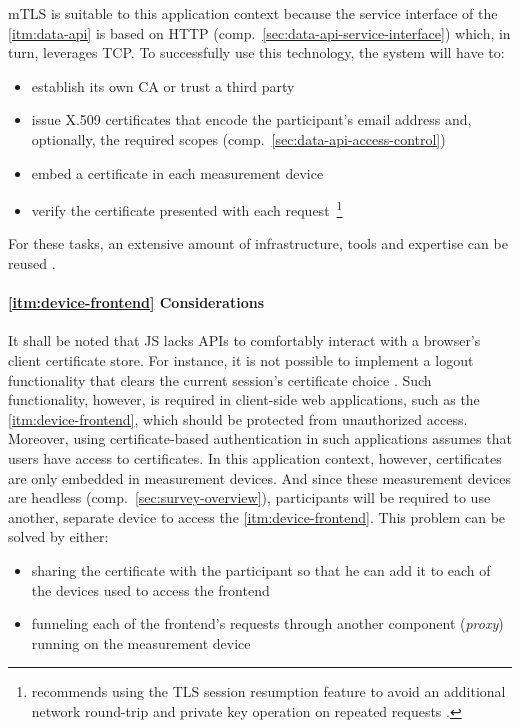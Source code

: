 \acs{mTLS} is suitable to this application context because the service interface of the \ref{itm:data-api} is based on \acs{HTTP} (comp.~\autoref{sec:data-api-service-interface}) which, in turn, leverages \acs{TCP}. To successfully use this technology, the system will have to:

\begin{itemize}
  \item establish its own \acs{CA} or trust a third party
  \item issue X.509 certificates that encode the participant's email address and, optionally, the required scopes (comp.~\autoref{sec:data-api-access-control})
  \item embed a certificate in each measurement device
  \item verify the certificate presented with each request~\footnote{\citeauthor{parsovs2013practical} recommends using the \acs{TLS} session resumption feature to avoid an additional network round-trip and private key operation on repeated requests \cite[p.~3]{parsovs2013practical}.}
\end{itemize}

For these tasks, an extensive amount of infrastructure, tools and expertise can be reused \cite[p.~37]{hummen2013towards}.


\paragraph{\ref{itm:device-frontend} Considerations}
It shall be noted that \acl{JS} lacks \acsp{API} to comfortably interact with a browser's client certificate store. For instance, it is not possible to implement a logout functionality that clears the current session's certificate choice \cite[p.~8]{parsovs2013practical}. Such functionality, however, is required in client-side web applications, such as the \ref{itm:device-frontend}, which should be protected from unauthorized access. Moreover, using certificate-based authentication in such applications assumes that users have access to certificates. In this application context, however, certificates are only embedded in measurement devices. And since these measurement devices are headless (comp.~\autoref{sec:survey-overview}), participants will be required to use another, separate device to access the \ref{itm:device-frontend}. This problem can be solved by either:

\begin{itemize}
  \item sharing the certificate with the participant so that he can add it to each of the devices used to access the frontend
  \item funneling each of the frontend's requests through another component (\textit{proxy}) running on the measurement device
\end{itemize}

